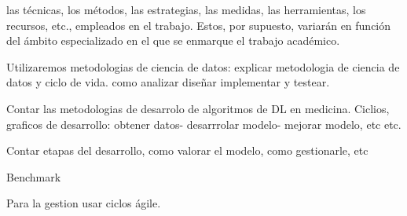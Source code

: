 las técnicas, los métodos, las estrategias, las medidas, las herramientas, los
recursos, etc., empleados en el trabajo. Estos, por supuesto, variarán en función
del ámbito especializado en el que se enmarque el trabajo académico.

Utilizaremos metodologias de ciencia de datos: explicar metodologia de ciencia de datos y ciclo de vida. como analizar diseñar implementar y testear.

Contar las metodologias de desarrolo de algoritmos de DL en medicina. Ciclios, graficos de desarrollo: obtener datos- desarrrolar modelo- mejorar modelo, etc etc.

Contar etapas del desarrollo, como valorar el modelo, como gestionarle, etc

Benchmark

Para la gestion usar ciclos ágile.